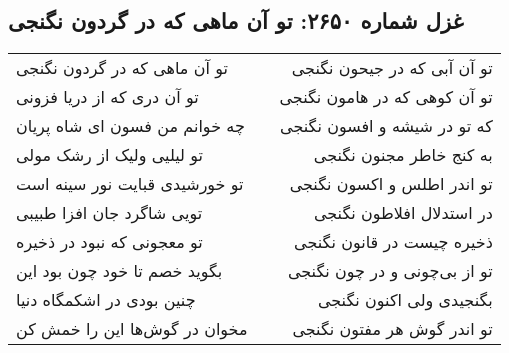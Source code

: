 \begin{center}
\section*{غزل شماره ۲۶۵۰: تو آن ماهی که در گردون نگنجی}
\label{sec:2650}
\begin{longtable}{l p{0.5cm} r}
تو آن ماهی که در گردون نگنجی
&&
تو آن آبی که در جیحون نگنجی
\\
تو آن دری که از دریا فزونی
&&
تو آن کوهی که در هامون نگنجی
\\
چه خوانم من فسون ای شاه پریان
&&
که تو در شیشه و افسون نگنجی
\\
تو لیلیی ولیک از رشک مولی
&&
به کنج خاطر مجنون نگنجی
\\
تو خورشیدی قبایت نور سینه است
&&
تو اندر اطلس و اکسون نگنجی
\\
تویی شاگرد جان افزا طبیبی
&&
در استدلال افلاطون نگنجی
\\
تو معجونی که نبود در ذخیره
&&
ذخیره چیست در قانون نگنجی
\\
بگوید خصم تا خود چون بود این
&&
تو از بی‌چونی و در چون نگنجی
\\
چنین بودی در اشکمگاه دنیا
&&
بگنجیدی ولی اکنون نگنجی
\\
مخوان در گوش‌ها این را خمش کن
&&
تو اندر گوش هر مفتون نگنجی
\\
\end{longtable}
\end{center}
